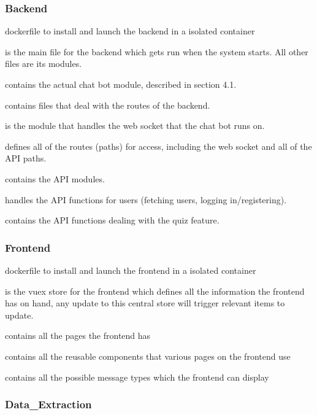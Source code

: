 \subsubsection{Backend}

 dockerfile to install and launch the backend in a isolated container

 is the main file for the backend which gets run when the system starts. All other files are its modules.

 contains the actual chat bot module, described in section 4.1.

 contains files that deal with the routes of the backend.

 is the module that handles the web socket that the chat bot runs on.

 defines all of the routes (paths) for access, including the web socket and all of the API paths.

 contains the API modules.

 handles the API functions for users (fetching users, logging in/registering).

 contains the API functions dealing with the quiz feature.

\subsubsection{Frontend}

 dockerfile to install and launch the frontend in a isolated container

 is the vuex store for the frontend which defines all the information the frontend has on hand, any update to this central store will trigger relevant items to update.

 contains all the pages the frontend has

 contains all the reusable components that various pages on the frontend use

 contains all the possible message types which the frontend can display

\subsubsection{Data\_Extraction}


